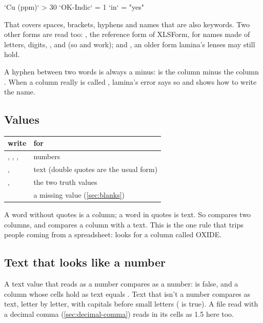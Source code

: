 \begin{codeblock}
`Cu (ppm)` > 30
`OK-Indic` = 1
`in` = "yes"
\end{codeblock}

That covers spaces, brackets, hyphens and names that are also keywords. Two other forms are read too:
, the reference form of XLSForm, for names made of letters, digits, \code{\_},
 and \code{-} (so  and  work); and \code{["Cu (ppm)"]},
an older form lamina's lenses may still hold.

\begin{caution}
A hyphen between two words is always a minus:  is the column  minus the column
. When a column really is called , lamina's error says so and shows how to
write the name.
\end{caution}

\subsection{Values}

\begin{center}\small
\begin{tabularx}{\linewidth}{@{}lL@{}}
\toprule
\sffamily\bfseries write & \sffamily\bfseries for \\
\midrule
{}, , ,  & numbers \\
,  & text (double quotes are the usual form) \\
,  & the two truth values \\
 & a missing value (\cref{sec:blanks}) \\
\bottomrule
\end{tabularx}
\end{center}

A word without quotes is a column; a word in quotes is text. So  compares two columns, and
 compares a column with a text. This is the one rule that trips people coming from a
spreadsheet:  looks for a column called OXIDE.

\subsection{Text that looks like a number}

A text value that reads as a number compares as a number:  is false, and a column
whose cells hold  as text equals . Text that isn't a number compares as text, letter by
letter, with capitals before small letters ( is true). A file read with a decimal
comma (\cref{sec:decimal-comma}) reads  in its cells as 1.5 here too.

